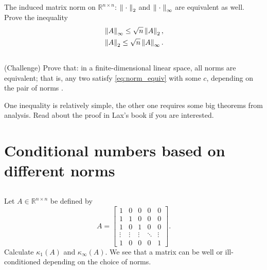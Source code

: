 \documentclass[11pt,letterpaper]{report}
\begin{document}
\subsection{}
The induced matrix norm on $\mathbb{R}^{n\times n}$: $\left\Vert \;\cdot\; \right\Vert_{2}$ and $\left\Vert \;\cdot\; \right\Vert_{\infty}$ are equivalent as well. Prove the inequality
\begin{align*}
    &\left\Vert A \right\Vert_\infty \leq \sqrt{n}\left\Vert A \right\Vert_2,\\
    &\left\Vert A \right\Vert_2 \leq \sqrt{n}\left\Vert A \right\Vert_\infty.
\end{align*}

\subsection{}
(Challenge) Prove that: in a finite-dimensional linear space, all norms are equivalent; that is, any two satisfy \eqref{eq:norm_equiv} with some $c$, depending on the pair of norms \cite[p.217]{Lax_07}.

One inequality is relatively simple, the other one requires some big theorems from analysis. Read about the proof in Lax's book if you are interested.

\section{Conditional numbers based on different norms}
\subsection{}
Let $A \in \mathbb{R}^{n\times n}$ be defined by
\begin{equation*}
    A = %
    \begin{bmatrix}
      1      & 0      & 0      & 0      &  0      \\ 
      1      & 1      & 0      & 0      &  0      \\
      1      & 0      & 1      & 0      &  0      \\
      \vdots & \vdots & \vdots & \ddots &  \vdots \\
      1      & 0      & 0      & 0      &  1
    \end{bmatrix}.
\end{equation*}
Calculate $\kappa_1(A)$ and $\kappa_\infty(A)$. We see that a matrix can be well or ill-conditioned depending on the choice of norms.
\end{document}

